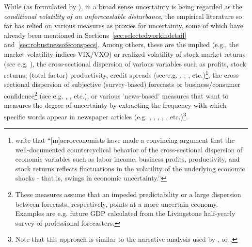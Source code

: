 \documentclass[a4paper,11pt,listof=nochaptergap,oneside,pointednumbers,bibtotoc,bigheadings,liststotoc,hidelinks]{scrbook}
\theoremstyle{mysatz}
\theoremstyle{mydefinition}
\theoremstyle{mytheorem}
\theoremstyle{mybemerkung}
\begin{document}
While (as formulated by \citealp{joetsetal:17}), in a broad sense uncertainty is being regarded as the \textit{conditional volatility of an unforecastable disturbance}, the empirical literature so far has relied on various measures as proxies for uncertainty, some of which have already been mentioned in Sections~\ref{sec:selectedworkindetail} and~\ref{sec:robustnessofeconspecs}. Among others, these are the implied (e.g., the market volatility indices VIX/VXO) or realized volatility of stock market returns (see e.g. \citealp{bloom:09}), the cross-sectional dispersion of various variables such as profits, stock returns, (total factor) productivity, credit spreads (see e.g. \citealp{bloom:09}, \citet{gilchristetal:14}, \citet{bloometal:12}, etc.)\footnote{\citet[p. 1]{gilchristetal:14} write that ``[m]acroeconomists have made a convincing argument that the well-documented countercyclical behavior of the cross-sectional dispersion of economic variables such as labor income, business profits, productivity, and stock returns reflects fluctuations in the volatility of the underlying economic shocks - that is, swings in economic uncertainty.''}, the cross-sectional dispersion of subjective (survey-based) forecasts or business/consumer confidence\footnote{These measures assume that an impeded predictability or a large dispersion between forecasts, respectively, points at a more uncertain economy. Examples are e.g. future GDP calculated from the Livingstone half-yearly survey of professional forecasters.} (see e.g. \citet{bachmannetal:13}, \citet{leducandliu:16}, etc.), or various 'news-based' measures that want to measures the degree of uncertainty by extracting the frequency with which specific words appear in newspaper articles (e.g. \citet{alexopoulosandcohen:09}, \citet{bakeretal:15}, \citet{moore:17}, \citet{bontempietal:16}, \citet{castelnuovoandtran:17}, etc.)\footnote{Note that this approach is similar to the narrative analysis used by \citet{romerandromer:04}, \citet{romandrom:17} or \citet{ramey:09}.}.
\end{document}
